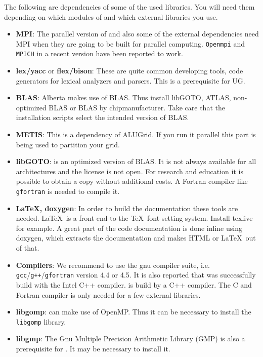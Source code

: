 The following are dependencies of some of the used libraries. You will need them depending on which modules of \Dune and which external libraries you use.
\begin{itemize}
\item \textbf{MPI}: The parallel version of \Dune and also some of the external dependencies need MPI when they are going to be built for parallel computing. \texttt{Openmpi} and \texttt{MPICH} in a recent version have been reported to work. 

\item \textbf{lex/yacc} or \textbf{flex/bison}: These are quite common developing tools, code generators for lexical analyzers and parsers. This is a prerequisite for UG.

\item \textbf{BLAS}: Alberta makes use of BLAS. Thus install libGOTO, ATLAS, non-optimized BLAS or BLAS by chipmanufacturer. Take care that the installation scripts select the intended version of BLAS. 

\item \textbf{METIS}: This is a dependency of ALUGrid. If you run it parallel this part is being used to partition your grid.

\item \textbf{libGOTO}: is an optimized version of BLAS. It is not always available for all architectures and 
the license is not open. For research and education it is possible to obtain a copy without additional costs.
A Fortran compiler like \texttt{gfortran} is needed to compile it.

\item \textbf{\LaTeX, doxygen}: In order to build the \Dumux documentation these tools are needed.  
\LaTeX\ is a front-end to the \TeX\ font setting system. Install texlive for example. A great part of the code documentation is done inline using doxygen, which extracts the documentation and makes HTML or \LaTeX\ out of that.

\item \textbf{Compilers}: We recommend to use the gnu compiler suite, i.e. \texttt{gcc}/\texttt{g++}/\texttt{gfortran} version 4.4 or 4.5.
It is also reported that \Dune was successfully build with the Intel C++ compiler. 
\Dune is build by a C++ compiler. The C and Fortran compiler is only needed for a few external libraries.

\item \textbf{libgomp}: \Dune can make use of OpenMP. Thus it can be necessary to install the \texttt{libgomp} library.

\item \textbf{libgmp}: The Gnu Multiple Precision Arithmetic Library (GMP) is also a prerequisite for \Dune. It may be necessary to install it.
\end{itemize}

